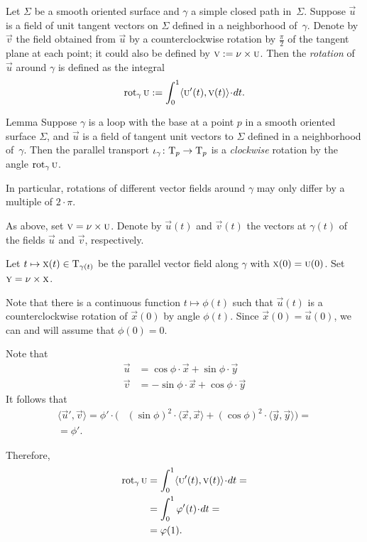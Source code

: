 Let $\Sigma$ be a smooth oriented surface and $\gamma$ a simple closed path in~$\Sigma$.
Suppose $\vec u$ is a field of unit tangent vectors on $\Sigma$ defined in a neighborhood of~$\gamma$.
Denote by $\vec v$ the field obtained from $\vec u$ by a counterclockwise rotation by $\tfrac{\pi}2$ of the tangent plane at each point; it could also be defined by $\text{\sc{v}}\mathrel{:=}\nu\times\text{\sc{u}}$.
Then the \emph{rotation} of $\vec u$ around $\gamma$ is defined as the integral
\[\rot_\gamma\vec u
\df
\int_0^1\langle\vec u'(t),\vec v(t)\rangle\cdot dt.\]

\begin{thm}{Lemma}\label{lem:rotation-parallel}
Suppose $\gamma$ is a loop with the base at a point $p$ in a smooth oriented surface $\Sigma$, and $\vec u$ is a field of tangent unit vectors to $\Sigma$ defined in a neighborhood of~$\gamma$.
Then the parallel transport $\iota_\gamma\colon\mathrm{T}_p\to\mathrm{T}_p$ is a {}\emph{clockwise} rotation by the angle $\mathop{\rm rot}\nolimits_\gamma\text{\sc{u}}$.

In particular, rotations of different vector fields around $\gamma$ may only differ by a multiple of $2\cdot\pi$.
\end{thm}

As above, set $\text{\sc{v}}=\nu\times\text{\sc{u}}$. 
Denote by $\vec u(t)$ and $\vec v(t)$ the vectors at $\gamma(t)$ of the fields $\vec u$ and $\vec v$, respectively.

Let $t\mapsto \text{\sc{x}}(t)\in \mathrm{T}_{\gamma(t)}$ be the parallel vector field along $\gamma$ with  $\vec x(0)\z=\vec u(0)$.
Set $\text{\sc{y}}=\nu\times\text{\sc{x}}$.

Note that there is a continuous function $t\mapsto \phi(t)$ such that 
$\vec u(t)$ is a counterclockwise rotation of $\vec x(0)$ by angle $\phi(t)$.
Since $\vec x(0)=\vec u(0)$, we can and will assume that $\phi(0)=0$.

Note that
\begin{align*}
\vec u&=\cos\phi\cdot \vec x+\sin\phi\cdot \vec y
\\
\vec v&=-\sin\phi\cdot \vec x+\cos\phi\cdot \vec y
\end{align*}
It follows that 
\begin{align*}
\langle\vec u',\vec v\rangle
=\phi'\cdot\biggl(&(\sin \phi)^2\cdot \langle\vec x,\vec x\rangle+(\cos \phi)^2\cdot \langle\vec y,\vec y\rangle
\biggr)=
\\
=\phi'.\ &
\end{align*}

Therefore,
\begin{align*}
\rot_\gamma\vec u&=\int_0^1\langle\vec u'(t),\vec v(t)\rangle\cdot dt=
\\
&=\int_0^1\phi'(t)\cdot dt=
\\
&=\phi(1).
\end{align*}

